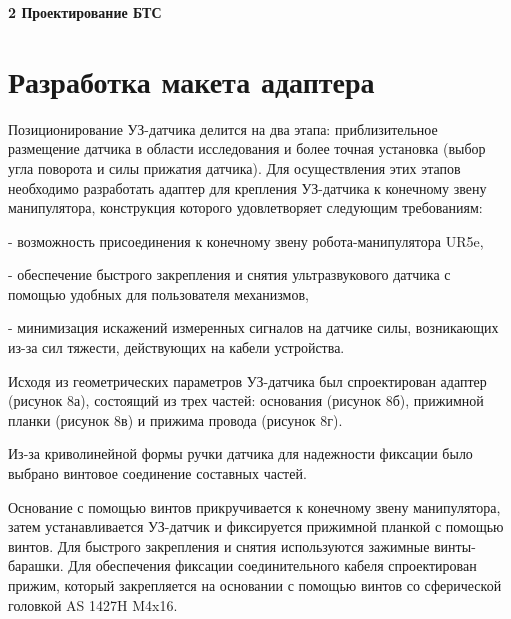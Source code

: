 
\newpage
\textbf{2 Проектирование БТС}

\section{Разработка макета адаптера}
Позиционирование УЗ-датчика делится на два этапа: приблизительное размещение датчика в области исследования и более точная установка (выбор угла поворота и силы прижатия датчика). Для осуществления этих этапов необходимо разработать адаптер для крепления УЗ-датчика к конечному звену манипулятора, конструкция которого удовлетворяет следующим требованиям:

- возможность присоединения к конечному звену робота-манипулятора UR5e,

- обеспечение быстрого закрепления  и снятия ультразвукового датчика с помощью удобных для пользователя механизмов, 

- минимизация искажений измеренных сигналов на датчике силы, возникающих из-за сил тяжести, действующих на кабели устройства.

Исходя из геометрических параметров УЗ-датчика был спроектирован адаптер (рисунок 8а), состоящий из трех частей: основания (рисунок 8б), прижимной планки (рисунок 8в) и прижима провода (рисунок 8г).

Из-за криволинейной формы ручки датчика для надежности фиксации было выбрано винтовое соединение составных частей. 

Основание с помощью винтов прикручивается к конечному звену манипулятора, затем устанавливается УЗ-датчик и фиксируется прижимной планкой с помощью винтов. Для быстрого закрепления и снятия используются зажимные винты-барашки. Для обеспечения фиксации соединительного кабеля спроектирован прижим, который закрепляется на основании с помощью винтов со сферической головкой AS 1427H M4x16. 

